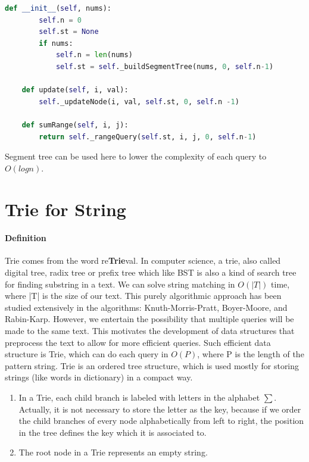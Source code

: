 \documentclass[../main.tex]{subfiles}
\begin{document}
\begin{examples}[resume]
\begin{lstlisting}[language=Python]
    def __init__(self, nums):
        self.n = 0
        self.st = None
        if nums:
            self.n = len(nums)
            self.st = self._buildSegmentTree(nums, 0, self.n-1)    
            
    def update(self, i, val):
        self._updateNode(i, val, self.st, 0, self.n -1)       

    def sumRange(self, i, j):
        return self._rangeQuery(self.st, i, j, 0, self.n-1)
\end{lstlisting}
\end{examples}

 

Segment tree can be used here to lower the complexity of each query to $O(log n)$. 

\section{Trie for String}
\label{concept_trie}
\paragraph{Definition} Trie comes from the word re\textbf{Trie}val. In computer science, a trie, also called digital tree, radix tree or prefix tree which like BST is also a kind of search tree for finding substring in a text. We can solve string matching in $O(|T|)$ time,  where |T| is the size of our text.  This purely algorithmic approach has been studied extensively in the algorithms:  Knuth-Morris-Pratt, Boyer-Moore, and Rabin-Karp. However, we entertain the possibility that multiple queries will be made to the same text.  This motivates the development of data structures that preprocess the text to allow for more efficient queries. Such efficient data structure is Trie, which can do each query in $O(P)$, where P is the length of the pattern string. Trie is an ordered tree structure, which is used mostly for storing strings (like words in dictionary) in a compact way. 
\begin{enumerate}
    \item In a Trie, each child branch is labeled with letters in the alphabet $\sum$. Actually, it is not necessary to store the letter as the key, because if we  order the child branches of every node alphabetically from left to right, the position in the tree defines the key which it is associated to. 
    \item The root node in a Trie represents an empty string. 
\end{enumerate}
\end{document}
